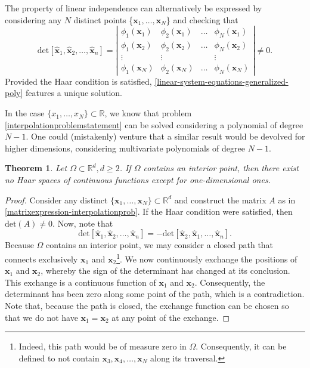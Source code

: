 \documentclass[12pt]{report} %
\newtheorem{theorem}{Theorem}
\newcommand{\tmmathbf}[1]{\ensuremath{\boldsymbol{#1}}}
\begin{document}
The property of linear independence can alternatively be expressed by
considering any $N$ distinct points  \{$\tmmathbf{x}_1, \ldots,
\tmmathbf{x}_N$\}  and checking that
\[ \text{det}  [\hat{\tmmathbf{x}}_1, \hat{\tmmathbf{x}}_2, \ldots,
   \hat{\tmmathbf{x}}_n] = \left|\begin{array}{cccc}
     \phi_1 (\tmmathbf{x}_1) & \phi_2 (\tmmathbf{x}_1) & \ldots & \phi_N
     (\tmmathbf{x}_1)\\
     \phi_1 (\tmmathbf{x}_2) & \phi_2 (\tmmathbf{x}_2) & \ldots & \phi_N
     (\tmmathbf{x}_2)\\
     \vdots & \vdots &  & \vdots\\
     \phi_1 (\tmmathbf{x}_N) & \phi_2 (\tmmathbf{x}_N) & \ldots & \phi_N
     (\tmmathbf{x}_N)
   \end{array}\right| \neq 0. \]
Provided the Haar condition is satisfied,
\eqref{linear-system-equations-generalized-poly} features a unique solution.

In the case $\{ x_1, \ldots, x_N \} \subset \mathbb{R}$, we know that problem
\ref{interpolationproblemstatement} can be solved considering a polynomial of
degree $N - 1$. One could (mistakenly) venture that a similar result would be devolved for
higher dimensions, considering multivariate polynomials of degree $N-1$.

\begin{theorem}\label{thm-haar-spaces-polynomials}
  Let $\Omega \subset \mathbb{R}^d, d \geq 2$. If $\Omega$ contains an
  interior point, then there exist no Haar spaces of continuous functions except for one-dimensional ones.
\end{theorem}

\begin{proof}
  Consider any distinct $\{ \tmmathbf{x}_1, \ldots, \tmmathbf{x}_N \} \subset
  \mathbb{R}^d$ and construct the matrix $A$ as in
  \eqref{matrixexpression-interpolationprob}. If the Haar condition were
  satisfied, then $\text{det} (A) \neq 0$. Now, note that $$\text{det}
  [\hat{\tmmathbf{x}}_1, \hat{\tmmathbf{x}}_2, \ldots, \hat{\tmmathbf{x}}_n] =
  - \text{det} [\hat{\tmmathbf{x}}_2, \hat{\tmmathbf{x}}_1, \ldots,
  \hat{\tmmathbf{x}}_n].$$ Because $\Omega$ contains an interior point, we may
  consider a closed path that connects exclusively $\tmmathbf{x}_1$ and
  $\tmmathbf{x}_2$\footnote{Indeed, this path would be of measure zero in
  $\Omega$. Consequently, it can be defined to not contain $\tmmathbf{x}_3,
  \tmmathbf{x}_4, \ldots, \tmmathbf{x}_N$ along its traversal.}. We now
  continuously exchange the positions of $\tmmathbf{x}_1$ and
  $\tmmathbf{x}_2$, whereby the sign of the determinant has changed
  at its conclusion. This exchange is a continuous function of $\tmmathbf{x}_1$
  and $\tmmathbf{x}_2$. Consequently, the determinant has been zero along some
  point of the path, which is a contradiction. Note that, because the path is
  closed, the exchange function can be chosen so that we do not have
  $\tmmathbf{x}_1 = \tmmathbf{x}_2$ at any point of the exchange.
\end{proof}
\end{document}
